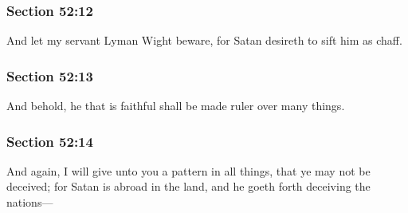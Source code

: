 
	\subsubsection{Section 52:12} %
		\label{DC52-12}

		And let my servant Lyman Wight beware, for Satan desireth to sift him as chaff.


	\subsubsection{Section 52:13} %
		\label{DC52-13}

		And behold, he that is faithful shall be made ruler over many things.


	\subsubsection{Section 52:14} %
		\label{DC52-14}

		And again, I will give unto you a pattern in all things, that ye may not be deceived; for Satan is abroad in the land, and he goeth forth deceiving the nations---

